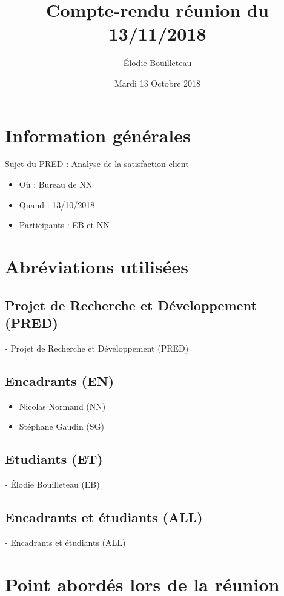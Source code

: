 \documentclass[11pt]{report}
\title{Compte-rendu réunion du 13/11/2018}
\author{Élodie Bouilleteau}
\date{Mardi 13 Octobre 2018}
\begin{document}
\maketitle
\renewcommand{\thesection}{\arabic{section}} 
\section{Information générales}
Sujet du PRED : Analyse de la satisfaction client
\\
	\begin{itemize}
		\item Où : Bureau de NN
		\item Quand : 13/10/2018
		\item Participants : EB et NN
	\end{itemize}

\section{Abréviations utilisées}

\subsection{Projet de Recherche et Développement (PRED)}
- Projet de Recherche et Développement (PRED)

\subsection{Encadrants (EN)}
 	\begin{itemize}
		\item Nicolas Normand (NN)
		\item Stéphane Gaudin (SG)
	\end{itemize}
    
\subsection{Etudiants (ET)}
- Élodie Bouilleteau (EB)

\subsection{Encadrants et étudiants (ALL)}
- Encadrants et étudiants (ALL)

\newpage

\section{Point abordés lors de la réunion}
\end{document}

